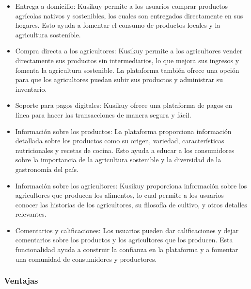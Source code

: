 \begin{itemize}

	\item Entrega a domicilio: Kusikuy permite a los usuarios comprar productos agrícolas nativos y sostenibles, los cuales son entregados directamente en sus hogares. Esto ayuda a fomentar el consumo de productos locales y la agricultura sostenible.

	\item Compra directa a los agricultores: Kusikuy permite a los agricultores vender directamente sus productos sin intermediarios, lo que mejora sus ingresos y fomenta la agricultura sostenible. La plataforma también ofrece una opción para que los agricultores puedan subir sus productos y administrar su inventario.

	\item Soporte para pagos digitales: Kusikuy ofrece una plataforma de pagos en línea para hacer las transacciones de manera segura y fácil.

	\item Información sobre los productos: La plataforma proporciona información detallada sobre los productos como su origen, variedad, características nutricionales y recetas de cocina. Esto ayuda a educar a los consumidores sobre la importancia de la agricultura sostenible y la diversidad de la gastronomía del país.

	\item Información sobre los agricultores: Kusikuy proporciona información sobre los agricultores que producen los alimentos, lo cual permite a los usuarios conocer las historias de los agricultores, su filosofía de cultivo, y otros detalles relevantes.

	\item Comentarios y calificaciones: Los usuarios pueden dar calificaciones y dejar comentarios sobre los productos y los agricultores que los producen. Esta funcionalidad ayuda a construir la confianza en la plataforma y a fomentar una comunidad de consumidores y productores.

\end{itemize}

\subsubsection{Ventajas}


